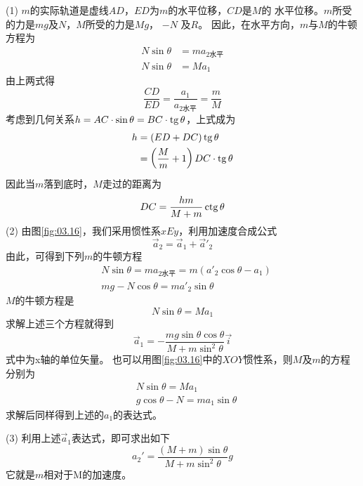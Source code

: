 (1) $ m $的实际轨道是虚线$ AD $，$ ED $为$ m $的水平位移，$ CD $是$ M $的
水平位移。$ m $所受的力是$ mg $及$ N $，$ M $所受的力是$ M g $， $ - N $ 及$ R $。
因此，在水平方向，$ m $与$ M $的牛顿方程为
\begin{align*}
  N \sin \theta & = m a _ { 2\text{水平} } \\
  N \sin \theta & = M a _ { 1 }
\end{align*}
由上两式得
\begin{equation*}
  \frac { C D } { E D } = \frac { a _ { 1 } } { a _ { 2\text{水平}}} = \frac { m } { M }
\end{equation*}
考虑到几何关系$ h = AC \cdot \sin \theta = BC \cdot \operatorname{tg} \theta $，上式成为
\begin{align*}
  h & = \left( E D + D C \right) \operatorname{tg} \theta                       \\
    & = \left( \frac { M } { m } + 1 \right) D C \cdot \operatorname{tg} \theta
\end{align*}
因此当$ m $落到底时，$ M $走过的距离为
\begin{equation*}
  D C = \frac { h m } { M + m } \operatorname{ctg} \theta
\end{equation*}
\clearpage
(2) 由图\ref{fig:03.16}，我们采用惯性系$ xEy $，利用加速度合成公式
\begin{equation*}
  \vec{a} _ { 2 } = \vec{a} _ { 1 } + \vec{a}' _ 2
\end{equation*}
由此，可得到下列$ m $的牛顿方程
\begin{align*}
   & N \sin \theta = m a _ { 2\text{水平} } = m \left( a '_2 \cos \theta - a _ { 1 } \right) \\
   & m g - N \cos \theta = m a' _ { 2 } \sin \theta
\end{align*}
$ M $的牛顿方程是
\begin{equation*}
  N \sin \theta = M a _ { 1 }
\end{equation*}
求解上述三个方程就得到
\begin{equation*}
  \vec{a} _ { 1 } = - \frac { m g \sin \theta \cos \theta} { M + m \sin ^ { 2 } \theta } \vec{i}
\end{equation*}式中为x轴的单位矢量。
也可以用图\ref{fig:03.16}\;中的$ XOY $惯性系，则$ M $及$ m $的方程分别为
\begin{align*}
   & N \sin \theta = M a _ { 1 }                 \\
   & g \cos \theta - N = m a _ { 1 } \sin \theta
\end{align*}
求解后同样得到上述的$ a_1 $的表达式。

(3) 利用上述$\vec{a}_1$表达式，即可求出如下
\begin{equation*}
  a _ 2 ' = \frac { \left( M + m \right) \sin \theta } { M + m \sin ^ { 2 } \theta } g
\end{equation*}
它就是$ m $相对于M的加速度。

